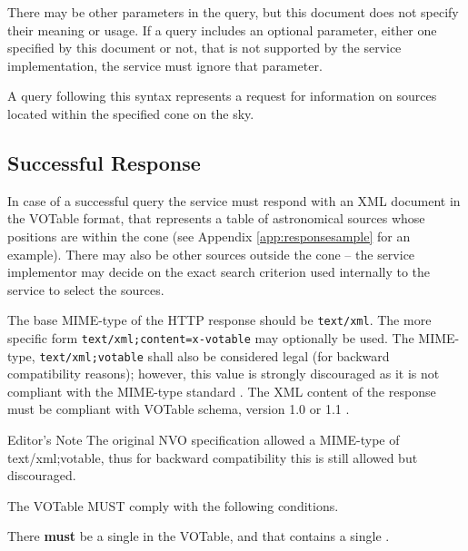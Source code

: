 \documentclass[11pt,a4paper]{ivoa}
\begin{document}
There may be other parameters in the query, but this document does not specify their meaning or usage. If a query includes an optional parameter, either one specified by this document or not, that is not supported by the service implementation, the service must ignore that parameter.

A query following this syntax represents a request for information on sources located within the specified cone on the sky.

\subsection{Successful Response}
\label{sec:response}
In case of a successful query the service must respond with an XML document in the VOTable format, that represents a table of astronomical sources whose positions are within the cone (see Appendix \ref{app:responsesample} for an example). There may also be other sources outside the cone -- the service implementor may decide on the exact search criterion used internally to the service to select the sources.

The base MIME-type of the HTTP response should be \texttt{text/xml}. The more specific form \texttt{text/xml;content=x-votable} may optionally be used. The MIME-type, \texttt{text/xml;votable} shall also be considered legal (for backward compatibility reasons); however, this value is strongly discouraged as it is not compliant with the MIME-type standard \citep{std:MIME}. The XML content of the response must be compliant with VOTable schema, version 1.0 \citep{std:VOT11} or 1.1 \citep{2004ivoa.spec.0811O}.

\begin{bigdescription}
	\item[Editor's Note] The original NVO specification allowed a MIME-type of text/xml;votable, thus for backward compatibility this is still allowed but discouraged.
\end{bigdescription}

The VOTable MUST comply with the following conditions.

There \textbf{must} be a single  in the VOTable, and that contains a single .
\end{document}
